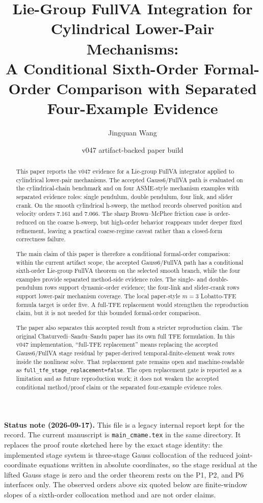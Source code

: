 \documentclass[11pt]{article}
\title{Lie-Group FullVA Integration for Cylindrical Lower-Pair Mechanisms:\\
A Conditional Sixth-Order Formal-Order Comparison with Separated Four-Example Evidence}
\author{Jingquan Wang}
\date{v047 artifact-backed paper build}
\newcommand{\method}{Gauss6/FullVA}
\newcommand{\tfe}{TFE}
\begin{document}
\maketitle

\noindent\textbf{Status note (2026-09-17).} This file is a legacy internal
report kept for the record. The current manuscript is \texttt{main\_cmame.tex}
in the same directory. It replaces the proof route sketched here by the exact
stage identity: the implemented stage system is three-stage Gauss collocation
of the reduced joint-coordinate equations written in absolute coordinates, so
the stage residual at the lifted Gauss stage is zero and the order theorem
rests on the P1, P2, and P6 interfaces only. The observed orders above six
quoted below are finite-window slopes of a sixth-order collocation method and
are not order claims.

\begin{abstract}
This paper reports the v047 evidence for a Lie-group FullVA integrator applied
to cylindrical lower-pair mechanisms.  The accepted \method{} path is evaluated
on the cylindrical-chain benchmark and on four ASME-style mechanism examples
with separated evidence roles: single pendulum, double pendulum, four link,
and slider crank.  On the smooth
cylindrical h-sweep, the method records observed position and velocity orders
7.161 and 7.066.  The sharp Brown--McPhee friction case is order-reduced on the
coarse h-sweep, but high-order behavior reappears under deeper fixed
refinement, leaving a practical coarse-regime caveat rather than a closed-form
correctness failure.

The main claim of this paper is therefore a conditional formal-order
comparison: within the current artifact scope, the accepted \method{} path
has a conditional sixth-order Lie-group FullVA theorem on the selected smooth
branch, while the four examples provide separated method-side evidence roles.
The single- and double-pendulum rows support dynamic-order evidence; the
four-link and slider-crank rows support lower-pair mechanism coverage.  The
local paper-style $m=3$ Lobatto-\tfe{} formula target is order five.  A
full-\tfe{} replacement would strengthen the reproduction claim, but it is not
needed for this bounded formal-order comparison.

The paper also separates this accepted result from a stricter reproduction
claim.  The original Chaturvedi--Sandu--Sandu paper has its own full \tfe{}
formulation.  In this v047 implementation, ``full-\tfe{} replacement'' means
replacing the accepted Gauss6/FullVA stage residual by paper-derived
temporal-finite-element weak rows inside the nonlinear solve.  That replacement
gate remains open and machine-readable as
\nolinkurl{full_tfe_stage_replacement=false}.  The open replacement gate is
reported as a limitation and as future reproduction work; it does not weaken
the accepted conditional method/proof claim or the separated four-example
evidence roles.
\end{abstract}
\end{document}
